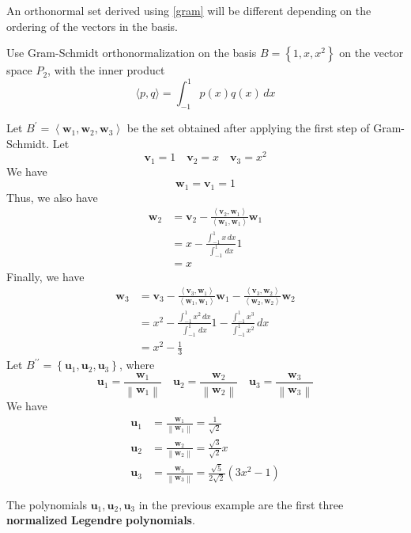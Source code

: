 \begin{remark}
    An orthonormal set derived using \ref{gram} will be different depending on the ordering of the vectors in the basis.
\end{remark}
\begin{exercise}
    Use Gram-Schmidt orthonormalization on the basis \(B=\left\{ 1,x,x^2 \right\} \) on the vector space \(P_2\), with the inner product
    \[
        \langle p,q \rangle = \int_{-1}^1 p(x)q(x)\,dx
    \]
\end{exercise}
\begin{solution}
    Let \(B^{\prime} =\left\langle \mathbf{w}_1,\mathbf{w}_2,\mathbf{w}_3 \right\rangle \) be the set obtained after applying the first step of Gram-Schmidt. Let
    \[
        \mathbf{v}_1 = 1\quad \mathbf{v}_2 = x\quad \mathbf{v}_3 = x^2
    \]
    We have
    \[
        \mathbf{w}_1 = \mathbf{v}_1 = 1
    \]
    Thus, we also have
    \begin{align*}
        \mathbf{w}_2 &= \mathbf{v}_2 -\frac{\left\langle \mathbf{v}_2,\mathbf{w}_1 \right\rangle }{\left\langle \mathbf{w}_1,\mathbf{w}_1 \right\rangle }\mathbf{w}_1\\
        &= x - \frac{\int_{-1}^1 x\,dx}{\int_{-1}^1 \,dx}1\\
        &= x
    \end{align*}
    Finally, we have
    \begin{align*}
        \mathbf{w}_{3}&= \mathbf{v}_3 - \frac{\left\langle \mathbf{v}_3,\mathbf{w}_1 \right\rangle }{\left\langle\mathbf{w}_1,\mathbf{w}_1 \right\rangle}\mathbf{w}_1 - \frac{\left\langle \mathbf{v}_3,\mathbf{w}_2 \right\rangle }{\left\langle\mathbf{w}_{2},\mathbf{w}_2 \right\rangle}\mathbf{w}_2\\
        &=x^2 - \frac{\int_{-1}^1 x^2\,dx}{\int_{-1}^1 \,dx}1 - \frac{\int_{-1}^1 x^3 }{\int_{-1}^1 x^2}\,dx\\
        &=x^2 - \frac{1}{3}
    \end{align*}
    Let \(B^{\prime\prime} =\left\{ \mathbf{u}_1,\mathbf{u}_2,\mathbf{u}_3 \right\} \), where 
    \[
        \mathbf{u}_1 = \frac{\mathbf{w}_1}{\left\lVert \mathbf{w}_1 \right\rVert }\quad\mathbf{u}_2 = \frac{\mathbf{w}_2}{\left\lVert \mathbf{w}_2 \right\rVert }\quad\mathbf{u}_3 = \frac{\mathbf{w}_3}{\left\lVert \mathbf{w}_3 \right\rVert }
    \]
    We have
    \begin{align*}
        \mathbf{u}_1 &= \frac{\mathbf{w}_1}{\left\lVert \mathbf{w}_1 \right\rVert }=\frac{1}{\sqrt{2} }\\
        \mathbf{u}_2 &=\frac{\mathbf{w}_2}{\left\lVert \mathbf{w}_2 \right\rVert }=\frac{\sqrt{3} }{\sqrt{2} }x\\
        \mathbf{u}_3 &= \frac{\mathbf{w}_3}{\left\lVert \mathbf{w}_3 \right\rVert }=\frac{\sqrt{5} }{2\sqrt{2} }\left( 3x^2 -1 \right) 
    \end{align*}
\end{solution}
\begin{remark}
    The polynomials \(\mathbf{u}_1,\mathbf{u}_2,\mathbf{u}_3\) in the previous example are the first three \textbf{normalized} \textbf{Legendre} \textbf{polynomials}.
\end{remark}
